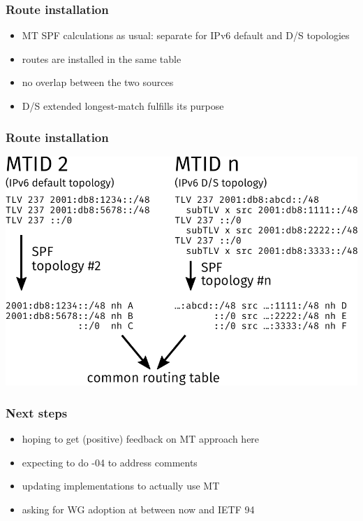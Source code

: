 \documentclass[12pt]{beamer}
\begin{document}
\begin{frame}
  \frametitle{Route installation}
  \begin{itemize}
    \item MT SPF calculations as usual: separate for IPv6 default and D/S topologies
    \item routes are installed in the same table
    \item no overlap between the two sources
    \item D/S extended longest-match fulfills its purpose
  \end{itemize}
\end{frame}

\begin{frame}
  \frametitle{Route installation}
  \begin{center}
    \includegraphics[scale=0.65,angle=0]{isis_93_mtmerge.pdf}%
  \end{center}
\end{frame}

\begin{frame}
  \frametitle{Next steps}
  \begin{itemize}
    \item hoping to get (positive) feedback on MT approach here
    \item expecting to do -04 to address comments
    \item updating implementations to actually use MT
    \item asking for WG adoption at between now and IETF 94
  \end{itemize}
\end{frame}
\end{document}
